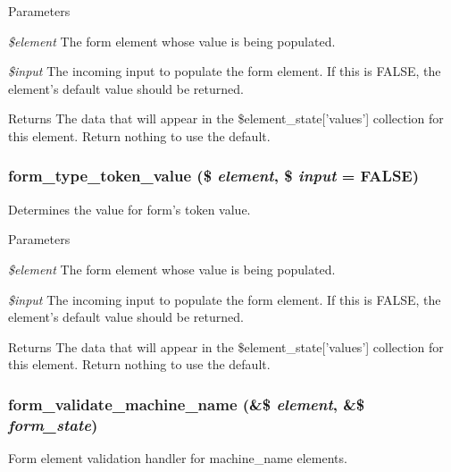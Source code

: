 \begin{DoxyParams}{Parameters}
\item[{\em \$element}]The form element whose value is being populated. \item[{\em \$input}]The incoming input to populate the form element. If this is FALSE, the element's default value should be returned.\end{DoxyParams}
\begin{DoxyReturn}{Returns}
The data that will appear in the \$element\_\-state\mbox{[}'values'\mbox{]} collection for this element. Return nothing to use the default. 
\end{DoxyReturn}
\hypertarget{group__form__api_ga0f9d352bfa7b36285b8ba1bf9fe3c9ca}{
\subsubsection[{form\_\-type\_\-token\_\-value}]{\setlength{\rightskip}{0pt plus 5cm}form\_\-type\_\-token\_\-value (\$ {\em element}, \/  \$ {\em input} = {\ttfamily FALSE})}}
\label{group__form__api_ga0f9d352bfa7b36285b8ba1bf9fe3c9ca}
Determines the value for form's token value.


\begin{DoxyParams}{Parameters}
\item[{\em \$element}]The form element whose value is being populated. \item[{\em \$input}]The incoming input to populate the form element. If this is FALSE, the element's default value should be returned.\end{DoxyParams}
\begin{DoxyReturn}{Returns}
The data that will appear in the \$element\_\-state\mbox{[}'values'\mbox{]} collection for this element. Return nothing to use the default. 
\end{DoxyReturn}
\hypertarget{group__form__api_ga22965a0e68fef7765e0eb2c475440e55}{
\subsubsection[{form\_\-validate\_\-machine\_\-name}]{\setlength{\rightskip}{0pt plus 5cm}form\_\-validate\_\-machine\_\-name (\&\$ {\em element}, \/  \&\$ {\em form\_\-state})}}
\label{group__form__api_ga22965a0e68fef7765e0eb2c475440e55}
Form element validation handler for machine\_\-name elements.

